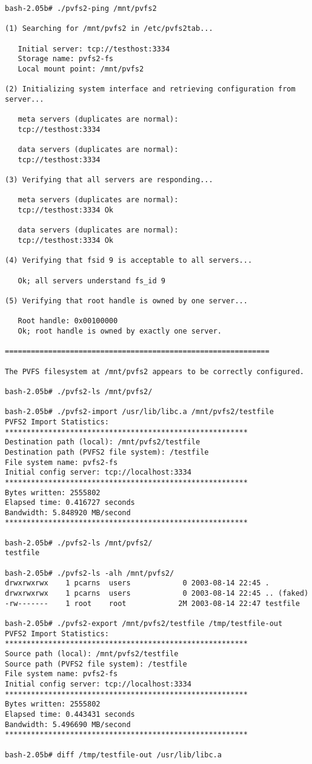 \documentclass[11pt, letterpaper]{article}
\begin{document}
\begin{verbatim}
bash-2.05b# ./pvfs2-ping /mnt/pvfs2

(1) Searching for /mnt/pvfs2 in /etc/pvfs2tab...

   Initial server: tcp://testhost:3334
   Storage name: pvfs2-fs
   Local mount point: /mnt/pvfs2

(2) Initializing system interface and retrieving configuration from server...

   meta servers (duplicates are normal):
   tcp://testhost:3334

   data servers (duplicates are normal):
   tcp://testhost:3334

(3) Verifying that all servers are responding...

   meta servers (duplicates are normal):
   tcp://testhost:3334 Ok

   data servers (duplicates are normal):
   tcp://testhost:3334 Ok

(4) Verifying that fsid 9 is acceptable to all servers...

   Ok; all servers understand fs_id 9

(5) Verifying that root handle is owned by one server...

   Root handle: 0x00100000
   Ok; root handle is owned by exactly one server.

=============================================================

The PVFS filesystem at /mnt/pvfs2 appears to be correctly configured.

bash-2.05b# ./pvfs2-ls /mnt/pvfs2/

bash-2.05b# ./pvfs2-import /usr/lib/libc.a /mnt/pvfs2/testfile
PVFS2 Import Statistics:
********************************************************
Destination path (local): /mnt/pvfs2/testfile
Destination path (PVFS2 file system): /testfile
File system name: pvfs2-fs
Initial config server: tcp://localhost:3334
********************************************************
Bytes written: 2555802
Elapsed time: 0.416727 seconds
Bandwidth: 5.848920 MB/second
********************************************************

bash-2.05b# ./pvfs2-ls /mnt/pvfs2/
testfile

bash-2.05b# ./pvfs2-ls -alh /mnt/pvfs2/
drwxrwxrwx    1 pcarns  users            0 2003-08-14 22:45 .
drwxrwxrwx    1 pcarns  users            0 2003-08-14 22:45 .. (faked)
-rw-------    1 root    root            2M 2003-08-14 22:47 testfile

bash-2.05b# ./pvfs2-export /mnt/pvfs2/testfile /tmp/testfile-out
PVFS2 Import Statistics:
********************************************************
Source path (local): /mnt/pvfs2/testfile
Source path (PVFS2 file system): /testfile
File system name: pvfs2-fs
Initial config server: tcp://localhost:3334
********************************************************
Bytes written: 2555802
Elapsed time: 0.443431 seconds
Bandwidth: 5.496690 MB/second
********************************************************

bash-2.05b# diff /tmp/testfile-out /usr/lib/libc.a
\end{verbatim}
\end{document}
